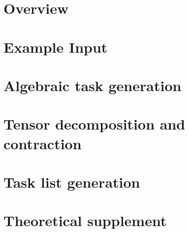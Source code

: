\documentclass[12pt]{report}
\begin{document}
\tableofcontents

\chapter*{Overview}


\chapter{Example Input}


\chapter{Algebraic task generation}


\chapter{Tensor decomposition and contraction}


\chapter{Task list generation}


\chapter{Theoretical supplement}


{}

\end{document}

